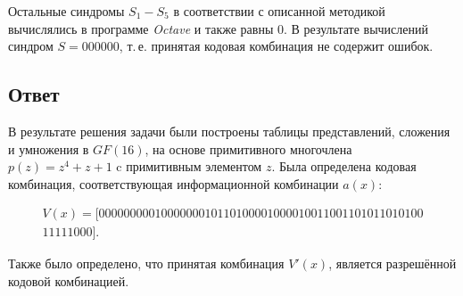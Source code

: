 Остальные синдромы $S_1 - S_5$ в соответствии с описанной методикой
вычислялись в программе \textit{Octave} и также равны 0. В результате
вычислений синдром $S = 000000$, т.\,е. принятая кодовая комбинация не
содержит ошибок.

\subsection{Ответ}






В результате решения задачи были построены таблицы представлений,
сложения и умножения в $GF(16)$, на основе примитивного многочлена
$p(z)=z^4+z+1$ c примитивным элементом $z$. Была определена кодовая
комбинация, соответствующая информационной комбинации $a(x)$:

\begin{gather*}
  V(x) = [0000000001000000010110100001000010011001101011010100\\
  11111000].
\end{gather*}


Также было определено, что принятая комбинация $V'(x)$, является
разрешённой кодовой комбинацией.
